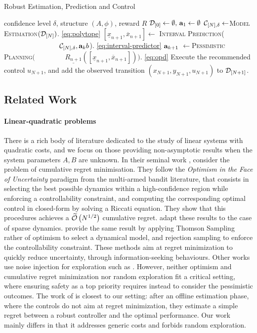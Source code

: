 \documentclass{article}
\begin{document}
\begin{algorithm}[tb]
	\caption{Robust Estimation, Prediction and Control}
	\label{alg:full}
	\begin{algorithmic}
		 confidence level $\delta$, structure $(A,\phi)$, reward $R$
		\STATE $\mathcal{D}_{[0]}\gets\emptyset,\, \mathbf{a}_1\gets\emptyset$
		\STATE $\mathcal{C}_{[N],\delta} \gets$\textsc{Model Estimation}$(\mathcal{D}_{[N]})$. \eqref{eq:polytope}
		\STATE $[\underline{x}_{n+1}, \overline{x}_{n+1}]\gets$ \textsc{Interval Prediction}(
		\STATE $\qquad\qquad\qquad\qquad\mathcal{C}_{[N],\delta}, \mathbf{a}_kb$). \eqref{eq:interval-predictor}
		\ENDFOR
		\STATE $\mathbf{a}_{k+1}$ $\gets$\textsc{Pessimistic Planning}$($
		\STATE$\qquad\qquad\underline{R_{n+1}}([\underline{x}_{n+1}, \overline{x}_{n+1}]))$.  \eqref{eq:opd}
		\ENDFOR
		\STATE Execute the recommended control $u_{N+1}$, and add the observed transition $(x_{N+1}, y_{N+1}, u_{N+1})$ to $\mathcal{D}_{[N+1]}$.
		\ENDFOR
	\end{algorithmic}
\end{algorithm}

\subsection{Related Work}

\paragraph{Linear-quadratic problems} There is a rich body of literature dedicated to the study of linear systems with quadratic costs, and we focus on those providing non-asymptotic results when the system parameters $A, B$ are unknown. In their seminal work \citet{abbasi-yadkori11a}, consider the problem of cumulative regret minimisation. They follow the \emph{Optimism in the Face of Uncertainty} paradigm from the multi-armed bandit literature, that consists in selecting the best possible dynamics within a high-confidence region while enforcing a controllability constraint, and computing the corresponding optimal control in closed-form by solving a Riccati equation. They show that this procedures achieves a $\widetilde{\mathcal{O}}\left(N^{1/2}\right)$ cumulative regret. \citep{Ibrahimi2013,Faradonbeh2017} adapt these results to the case of sparse dynamics. \citet{Ouyang2017,abeille18a} provide the same result by applying Thomson Sampling rather of optimism to select a dynamical model, and rejection sampling to enforce the controllability constraint. These methods aim at regret minimization to quickly reduce uncertainty, through information-seeking behaviours. Other works use noise injection for exploration such as \citep{Dean2017,Dean2018}. However, neither optimism and cumulative regret minimization nor random exploration fit a critical setting, where ensuring safety as a top priority requires instead to consider the pessimistic outcomes.
The work of \citet{Dean2017} is closest to our setting: after an offline estimation phase, where the controls do not aim at regret minimization, they estimate a simple regret between a robust controller and the optimal performance. Our work mainly differs in that it addresses generic costs and forbids random exploration.
\end{document}
